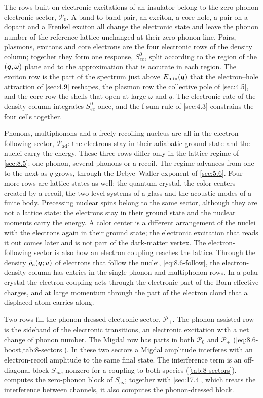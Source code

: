 The rows built on electronic excitations of an insulator belong to the zero-phonon electronic sector, $\mathcal{P}_0$. A band-to-band pair, an exciton, a core hole, a pair on a dopant and a Frenkel exciton all change the electronic state and leave the phonon number of the reference lattice unchanged at their zero-phonon line. Pairs, plasmons, excitons and core electrons are the four electronic rows of the density column; together they form one response, $S^0_{ee}$, split according to the region of the $(\bm{q},\omega)$ plane and to the approximation that is accurate in each region. The exciton row is the part of the spectrum just above $E_{\mathrm{min}}(\bm{q})$ that the electron--hole attraction of \cref{sec:4.9} reshapes, the plasmon row the collective pole of \cref{sec:4.5}, and the core row the shells that open at large $\omega$ and $q$. The electronic rate of the density column integrates $S^0_{ee}$ once, and the f-sum rule of \cref{sec:4.3} constrains the four cells together.

Phonons, multiphonons and a freely recoiling nucleus are all in the electron-following sector, $\mathcal{P}_{\mathrm{ad}}$: the electrons stay in their adiabatic ground state and the nuclei carry the energy. These three rows differ only in the lattice regime of \cref{sec:8.5}: one phonon, several phonons or a recoil. The regime advances from one to the next as $q$ grows, through the Debye--Waller exponent of \cref{sec:5.6}. Four more rows are lattice states as well: the quantum crystal, the color centers created by a recoil, the two-level systems of a glass and the acoustic modes of a finite body. Precessing nuclear spins belong to the same sector, although they are not a lattice state: the electrons stay in their ground state and the nuclear moments carry the energy. A color center is a different arrangement of the nuclei with the electrons again in their ground state; the electronic excitation that reads it out comes later and is not part of the dark-matter vertex. The electron-following sector is also how an electron coupling reaches the lattice. Through the density $\bar\rho_e(\bm{q};u)$ of electrons that follow the nuclei, \cref{eq:8.6-follow}, the electron-density column has entries in the single-phonon and multiphonon rows. In a polar crystal the electron coupling acts through the electronic part of the Born effective charges, and at large momentum through the part of the electron cloud that a displaced atom carries along.

Two rows fill the phonon-dressed electronic sector, $\mathcal{P}_+$. The phonon-assisted row is the sideband of the electronic transitions, an electronic excitation with a net change of phonon number. The Migdal row has parts in both $\mathcal{P}_0$ and $\mathcal{P}_+$ (\cref{eq:8.6-boost,tab:8-sectors}). In these two sectors a Migdal amplitude interferes with an electron-recoil amplitude to the same final state. The interference term is an off-diagonal block $S_{e\kappa}$, nonzero for a coupling to both species (\cref{tab:8-sectors}).  computes the zero-phonon block of $S_{e\kappa}$; together with \cref{sec:17.4}, which treats the interference between channels, it also computes the phonon-dressed block.

